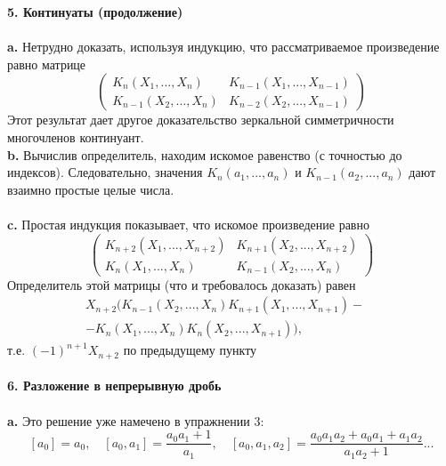 \noindent\textbf{5. Континуаты (продолжение)}\\
\\
\hspace*{15pt}\textbf{a.} Нетрудно доказать, используя индукцию, что рассматриваемое\linebreak
произведение равно матрице
$$\begin{pmatrix}
	K_n(X_1,...,X_n)& K_{n-	1}(X_1,...,X_{n-1})\\
	K_{n-1}(X_2,...,X_n)& K_{n-2}(X_2,...,X_{n-1})
\end{pmatrix}$$
\noindent Этот результат дает другое доказательство зеркальной симметричности\linebreak
многочленов континуант.\newline
\\
\hspace*{15pt}\textbf{b.} Вычислив определитель, находим искомое равенство (с точно­стью\linebreak
до индексов). Следовательно, значения $K_n(a_1,...,a_n)$ и\linebreak
$K_{n-1}(a_2,...,a_n)$ дают взаимно простые целые числа.\\
\\
\hspace*{15pt}\textbf{c.} Простая индукция показывает, что искомое произведение равно
$$\begin{pmatrix}
	K_{n+2}(X_1,...,X_{n+2})& K_{n+1}(X_2,...,X_{n+2})\\
	K_n(X_1,...,X_n)& K_{n-1}(X_2,...,X_n)
\end{pmatrix}$$
\noindent Определитель этой матрицы (что и требовалось доказать) равен
\begin{eqnarray*}
	X_{n+2}\Big( K_{n-1}(X_2,...,X_n) K_{n+1}(X_1,...,X_{n+1})-\quad\\
	-K_n(X_1,...,X_n)K_n(X_2,...,X_{n+1}) \Big),
\end{eqnarray*}
т.е.\:\: $(-1)^{n+1}X_{n+2}$\:\: по предыдущему пункту\\
\\

\noindent\textbf{6. Разложение в непрерывную дробь}\\
\\
\hspace*{15pt}\textbf{a.} Это решение уже намечено в упражнении 3:
$$[a_0]=a_0,\quad [a_0,a_1]=\frac{a_0a_1+1}{a_1},\quad [a_0,a_1,a_2]=\frac{a_0a_1a_2+a_0a_1+a_1a_2}{a_1a_2+1}...$$
\newpage

